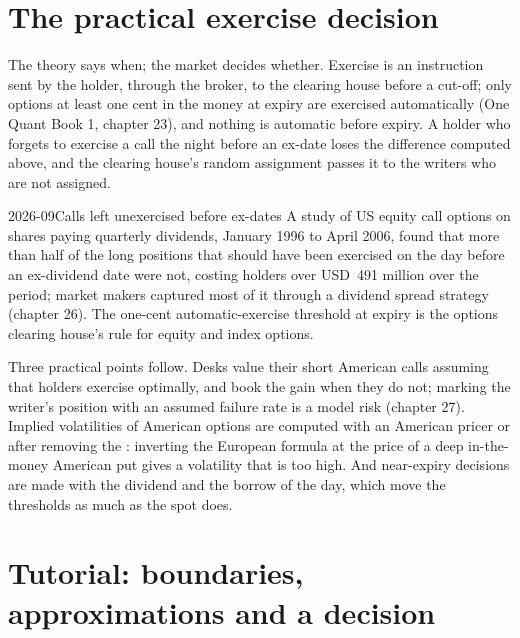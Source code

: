 \section{The practical exercise decision}

The theory says when; the market decides whether. Exercise is an instruction sent by the
holder, through the broker, to the clearing house before a cut-off; only options at least
one cent in the money at expiry are exercised automatically (One Quant Book 1, chapter 23),
and nothing is automatic before expiry. A holder who forgets to exercise a call the night
before an ex-date loses the difference computed above, and the clearing house's random
assignment passes it to the writers who are not assigned.

\begin{dated}{2026-09}{Calls left unexercised before ex-dates}\label{dat:dv:american-options-and-early-exercise:pool}
A study of US equity call options on shares paying quarterly dividends, January 1996 to
April 2006, found that more than half of the long positions that should have been
exercised on the day before an ex-dividend date were not, costing holders over
USD~491 million over the period; market makers captured most of it through a dividend
spread strategy (chapter 26). The one-cent automatic-exercise threshold at expiry is the
options clearing house's rule for equity and index options.
\end{dated}

Three practical points follow. Desks value their short American calls assuming that
holders exercise optimally, and book the gain when they do not; marking the writer's
position with an assumed failure rate is a model risk (chapter 27). Implied volatilities
of American options are computed with an American pricer or after removing the
: inverting the European formula at the price of a deep in-the-money
American put gives a volatility that is too high. And near-expiry decisions are made with
the dividend and the borrow of the day, which move the thresholds as much as the spot does.

\section{Tutorial: boundaries, approximations and a decision}\label{tut:dv:american-options-and-early-exercise:tut}

